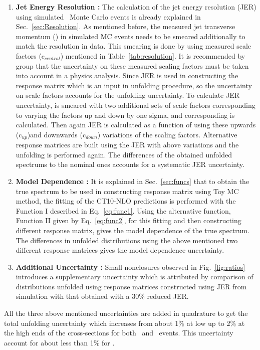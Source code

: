 \begin{enumerate}
\item {\bf Jet Energy Resolution :} The calculation of the jet energy resolution (JER) using simulated \MGP~Monte Carlo events is already explained in Sec.~\ref{sec:Resolution}. As mentioned before, the measured jet transverse momentum (\ptn) in simulated MC events needs to be smeared additionally to match the resolution in data. This smearing is done by using measured scale factors (c$_{central}$) mentioned in Table~\ref{tab:resolution}. It is recommended by \JetMet group that the uncertainty on these measured scaling factors must be taken into account in a physics analysis. Since JER is used in constructing the response matrix which is an input in unfolding procedure, so the uncertainty on scale factors accounts for the unfolding uncertainty. To calculate JER uncertainty, \pt is smeared with two additional sets of scale factors corresponding to varying the factors up and down by one sigma, and corresponding \httwo is calculated. Then again JER is calculated as a function of \httwo using these upwards (c$_{up}$)and downwards (c$_{down}$) variations of the scaling factors. Alternative response matrices are built using the JER with above variations and the unfolding is performed again. The differences of the obtained unfolded spectrums to the nominal ones accounts for a systematic JER uncertainty. 

\item {\bf Model Dependence :} It is explained in Sec.~\ref{sec:funcs} that to obtain the true \httwo spectrum to be used in constructing response matrix using Toy MC method, the fitting of the CT10-NLO predictions is performed with the Function I described in Eq.~\ref{eq:func1}. Using the alternative function, Function II given by Eq.~\ref{eq:func2}, for this fitting and then constructing different response matrix, gives the model dependence of the true \httwo spectrum. The differences in unfolded distributions using the above mentioned two different response matrices gives the model dependence uncertainty.

\item {\bf Additional Uncertainty :} Small nonclosures observed in Fig.~\ref{fig:ratios} introduces a supplementary uncertainty which is attributed by comparison of distributions unfolded using response matrices constructed using JER from simulation with that obtained with a 30\% reduced JER. 
\end{enumerate}

All the three above mentioned uncertainties are added in quadrature to get the total unfolding uncertainty which increases from about 1\% at low \httwo up to 2\% at the high \httwo ends of the cross-sections for both \njt~and \njth~events. This uncertainty account for about less than 1\% for \ratio.

